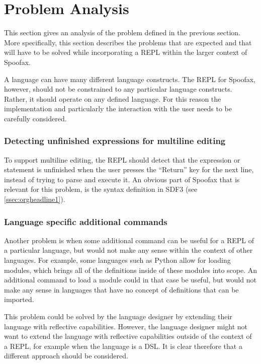 \section{Problem Analysis}
\label{sec:problem-analysis}

This section gives an analysis of the problem defined in the previous section.
More specifically, this section describes the problems that are expected and
that will have to be solved while incorporating a REPL
within the larger context of Spoofax.

A language can have many different language constructs. The REPL for Spoofax,
however, should not be constrained to any particular language constructs.
Rather, it should operate on any defined language. For this reason the
implementation and particularly the interaction with the user needs to be
carefully considered.

\subsubsection{Detecting unfinished expressions for multiline editing}
\label{sec:detect-unfin-expr}
To support multiline editing, the REPL should detect that the
expression or statement is unfinished when the user presses the
``Return'' key for the next line, instead of trying to parse and
execute it. An obvious part of Spoofax that is relevant for this
problem, is the syntax definition in SDF3 (see
\cref{ssec:orgheadline1}).

\subsubsection{Language specific additional commands}
\label{sec:lang-spec-addit}
Another problem is when some additional command can be useful for a
REPL of a particular language, but would not make any sense within the
context of other languages. For example, some languages such as Python
allow for loading modules, which brings all of the definitions inside
of these modules into scope. An additional command to load a module could in that
case be useful, but would not make any sense in languages that have no
concept of definitions that can be imported.

This problem could be solved by the language designer by extending
their language with reflective capabilities. However, the language
designer might not want to extend the language with reflective
capabilities outside of the context of a REPL, for example when the
language is a DSL. It is clear therefore that a different approach
should be considered.

